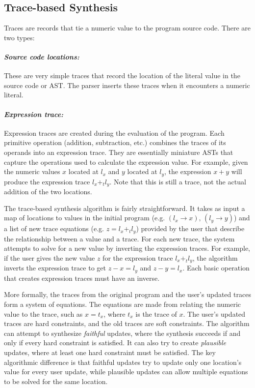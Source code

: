 \documentclass[nocopyrightspace,numbers,10pt]{sigplanconf}
\begin{document}
\subsection{Trace-based Synthesis}
\label{sub:background:tbs}

Traces are records that tie a numeric value to the program source code. There
are two types:

\paragraph{\emph{Source code locations:}} These are very simple traces that
record the location of the literal value in the source code or AST. The parser
inserts these traces when it encounters a numeric literal.

\paragraph{\emph{Expression trace:}} Expression traces are created during the
evaluation of the program. Each primitive operation (addition, subtraction,
etc.) combines the traces of its operands into an expression trace. They are
essentially miniature ASTs that capture the operations used to calculate the
expression value. For example, given the numeric values $x$ located at $l_x$ and
$y$ located at $l_y$, the expression $x + y$ will produce the expression trace
$l_x +_t l_y$. Note that this is still a trace, not the actual addition of the
two locations.

The trace-based synthesis algorithm is fairly straightforward. It takes as input
a map of locations to values in the initial program (e.g. $(l_x \rightarrow
x),\,(l_y \rightarrow y)$) and a list of new trace equations (e.g. $z = l_x +_t
l_y$) provided by the user that describe the relationship between a value and a
trace.  For each new trace, the system attempts to solve for a new value by
inverting the expression traces. For example, if the user gives the new value
$z$ for the expression trace $l_x +_t l_y$, the algorithm inverts the expression
trace to get $z - x = l_y$ and $z - y = l_x$. Each basic operation that creates
expression traces must have an inverse.

More formally, the traces from the original program and the user's updated
traces form a system of equations. The equations are made from relating the
numeric value to the trace, such as $x = t_x$, where $t_x$ is the trace of $x$.
The user's updated traces are hard constraints, and the old traces are soft
constraints. The algorithm can attempt to synthesize \emph{faithful} updates,
where the synthesis succeeds if and only if every hard constraint is satisfied.
It can also try to create \emph{plausible} updates, where at least one hard
constraint must be satisfied. The key algorithmic difference is that faithful
updates try to update only one location's value for every user update, while
plausible updates can allow multiple equations to be solved for the same
location.
\end{document}
